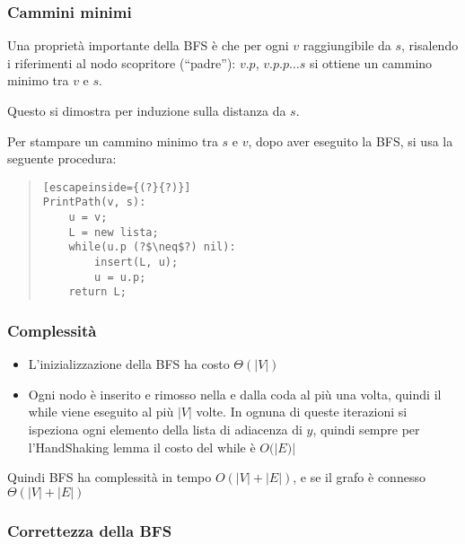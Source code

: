 \documentclass[a4paper,10pt]{article}
\theoremstyle{definition}
\begin{document}
\subsubsection{Cammini minimi}
Una proprietà importante della BFS è che per ogni $v$ raggiungibile da $s$, risalendo i riferimenti al nodo scopritore (``padre''): $v.p$, $v.p.p \hdots s$ si ottiene un cammino minimo tra $v$ e $s$. 

Questo si dimostra per induzione sulla distanza da $s$.\smallskip

Per stampare un cammino minimo tra $s$ e $v$, dopo aver eseguito la BFS, si usa la seguente procedura:

\begin{quote}
 \begin{lstlisting}[escapeinside={(?}{?)}]
PrintPath(v, s):
    u = v;
    L = new lista;
    while(u.p (?$\neq$?) nil):
        insert(L, u);
        u = u.p;
    return L;
 \end{lstlisting}

\end{quote}

\subsubsection{Complessità}
\begin{itemize}
 \item L'inizializzazione della BFS ha costo $\Theta(|V|)$ 
 \item Ogni nodo è inserito e rimosso nella e dalla coda al più una volta, quindi il while viene eseguito al più $|V|$ volte. In ognuna di queste iterazioni si ispeziona ogni elemento della lista di adiacenza di $y$, quindi sempre per l'HandShaking lemma il costo del while è $O(|E)|$
\end{itemize}
Quindi BFS ha complessità in tempo $O(|V| + |E|)$, e se il grafo è connesso $\Theta(|V| + |E|)$

\newpage
\subsubsection{Correttezza della BFS}
\end{document}
